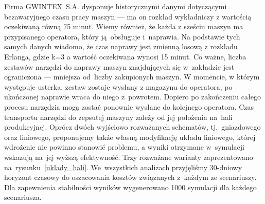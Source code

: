 \documentclass[12pt, a4paper, oneside]{mwart} %
\begin{document}
Firma GWINTEX~S.A. dysponuje historycznymi danymi dotyczącymi bezawaryjnego czasu pracy maszyn --- ma on rozkład wykładniczy z wartością oczekiwaną równą 75 minut. Wiemy również, że każda z sześciu maszyn ma przypisanego operatora, który ją~obsługuje i~naprawia. Na podstawie tych samych danych wiadomo, że czas naprawy jest zmienną losową z rozkładu Erlanga, gdzie k=3 a wartość oczekiwana wynosi 15 minut. Co ważne, liczba zestawów narzędzi do naprawy maszyn znajdujących się w~zakładzie jest ograniczona --- mniejsza od~liczby zakupionych maszyn. W momencie, w którym występuje usterka, zestaw zostaje wysłany z magazynu do operatora, po ukończonej naprawie wraca do niego z~powrotem. Dopiero po zakończeniu całego procesu narzędzia mogą zostać ponownie wysłane do kolejnego operatora. Czas transportu narzędzi do zepsutej maszyny zależy od jej położenia na~hali produkcyjnej. Oprócz dwóch wyjściowo rozważanych schematów, tj.~gniazdowego oraz liniowego, proponujemy także własną modyfikację układu liniowego, której wdrożenie nie powinno stanowić problemu, a wyniki otrzymane w~symulacji wskazują na~jej wyższą efektywność. Trzy rozważane warianty zaprezentowano na~rysunku~\ref{uklady_hali}. We~wszystkich analizach przyjęliśmy 30-dniowy horyzont czasowy do oszacowania kosztów związanych z~każdym ze scenariuszy. Dla zapewnienia stabilności wyników wygenerowano 1000 symulacji dla każdego scenariusza.
\end{document}

